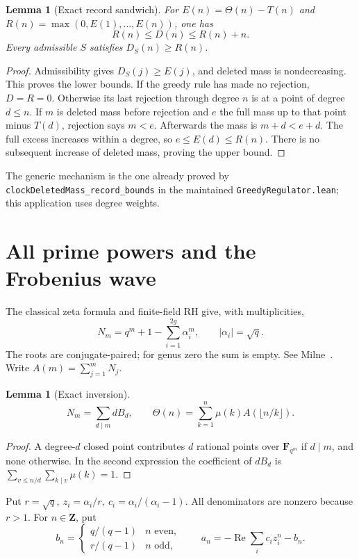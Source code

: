 \documentclass[11pt]{article}
\newtheorem{lemma}[theorem]{Lemma}
\newcommand{\F}{\mathbf F}
\newcommand{\Z}{\mathbf Z}
\newcommand{\Real}{\operatorname{Re}}
\begin{document}
\begin{lemma}[Exact record sandwich]\label{lem:record}
For \(E(n)=\Theta(n)-T(n)\) and
\(R(n)=\max(0,E(1),\ldots,E(n))\), one has
\[
 R(n)\leq D(n)\leq R(n)+n.                         \tag{1}
\]
Every admissible \(S\) satisfies \(D_S(n)\geq R(n)\).
\end{lemma}
\begin{proof}
Admissibility gives \(D_S(j)\geq E(j)\), and deleted mass is
nondecreasing. This proves the lower bounds. If the greedy rule has
made no rejection, \(D=R=0\). Otherwise its last rejection through
degree \(n\) is at a point of degree \(d\leq n\). If \(m\) is deleted
mass before rejection and \(e\) the full mass up to that point minus
\(T(d)\), rejection says \(m<e\). Afterwards the mass is \(m+d<e+d\).
The full excess increases within a degree, so \(e\leq E(d)\leq R(n)\).
There is no subsequent increase of deleted mass, proving the upper bound.
\end{proof}
The generic mechanism is the one already proved by
\texttt{clockDeletedMass\_record\_bounds} in the maintained
\texttt{GreedyRegulator.lean}; this application uses degree weights.

\section{All prime powers and the Frobenius wave}
The classical zeta formula and finite-field RH give, with multiplicities,
\[
 N_m=q^m+1-\sum_{i=1}^{2g}\alpha_i^m,\qquad
 |\alpha_i|=\sqrt q.                              \tag{2}\label{eq:weil}
\]
The roots are conjugate-paired; for genus zero the sum is empty.
See Milne~\cite{Milne}. Write \(A(m)=\sum_{j=1}^mN_j\).

\begin{lemma}[Exact inversion]\label{lem:mobius}
\[
 N_m=\sum_{d\mid m}dB_d,\qquad
 \Theta(n)=\sum_{k=1}^n\mu(k)A(\lfloor n/k\rfloor). \tag{3}\label{eq:mobius}
\]
\end{lemma}
\begin{proof}
A degree-\(d\) closed point contributes \(d\) rational points over
\(\F_{q^m}\) if \(d\mid m\), and none otherwise. In the second expression
the coefficient of \(dB_d\) is
\(\sum_{v\leq n/d}\sum_{k\mid v}\mu(k)=1\).
\end{proof}

Put \(r=\sqrt q,\ z_i=\alpha_i/r,\ c_i=\alpha_i/(\alpha_i-1)\).
All denominators are nonzero because \(r>1\). For \(n\in\Z\), put
\[
 b_n=\begin{cases}q/(q-1)&n\text{ even},\\
 r/(q-1)&n\text{ odd},\end{cases}
 \qquad a_n=-\Real\sum_i c_i z_i^n-b_n.             \tag{4}\label{eq:wave}
\]
\end{document}
